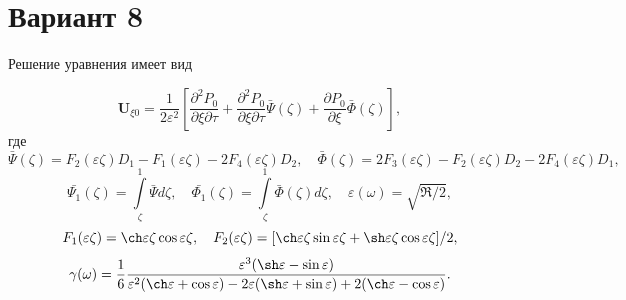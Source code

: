 \documentclass{article}
\begin{document}
\section*{Вариант 8}
Решение уравнения имеет вид

\begin{equation}
  \mathbf{U}_{\xi0} = \frac{1}{2\varepsilon^2}\left[ \frac{\partial^2 P_0}{\partial\xi\partial\tau} + 
  \frac{\partial^2 P_0}{\partial\xi\partial\tau} \bar{\Psi}(\zeta) + 
  \frac{\partial P_0}{\partial\xi}\bar{\Phi}(\zeta)  \right],
\end{equation}
где
$$
  \bar{\Psi}(\zeta) = F_2(\varepsilon\zeta)D_1 - F_1(\varepsilon\zeta) - 2F_4(\varepsilon\zeta)D_2, \quad
  \bar{\Phi}(\zeta) =  2F_3(\varepsilon\zeta) - F_2(\varepsilon\zeta)D_2 - 2F_4(\varepsilon\zeta)D_1,
$$
$$
  \bar{\Psi_1}(\zeta) = \int\limits_{\zeta}^{1} \bar{\Psi}d\zeta,  \quad
  \bar{\Phi_1}(\zeta) = \int\limits_{\zeta}^{1}\bar{\Phi}(\zeta)d\zeta, \quad   
  \varepsilon(\omega) = \sqrt{\mathfrak{R}/2}, 
$$
$$
  F_1(\varepsilon\zeta) = \ch\varepsilon\zeta\cos\varepsilon\zeta, \quad
  F_2(\varepsilon\zeta) = [\ch\varepsilon\zeta\sin\varepsilon\zeta + \sh\varepsilon\zeta\cos\varepsilon\zeta]/2,
$$
$$
  \gamma(\omega) = \frac{1}{6}\frac{\varepsilon^3(\sh\varepsilon - \sin\varepsilon)}
  {\varepsilon^2(\ch\varepsilon + \cos\varepsilon) - 2\varepsilon(\sh\varepsilon + \sin\varepsilon) + 2(\ch\varepsilon - \cos\varepsilon)}.
$$
\end{document}
